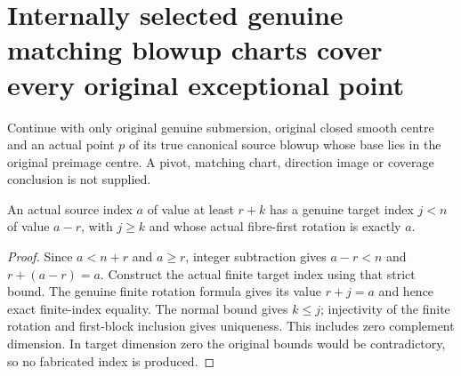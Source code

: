 \section{Internally selected genuine matching blowup charts cover every original exceptional point}
Continue with only original genuine submersion, original closed smooth centre and an actual point $p$ of its true canonical source blowup whose base lies in the original preimage centre. A pivot, matching chart, direction image or coverage conclusion is not supplied.

\begin{lemma}
\label{hir:submersion-adapted-blowup-cover-original-index}
\leanok
{}

An actual source index $a$ of value at least $r+k$ has a genuine target index $j<n$ of value $a-r$, with $j\geq k$ and whose actual fibre-first rotation is exactly $a$.
\end{lemma}
\begin{proof}
Since $a<n+r$ and $a\geq r$, integer subtraction gives $a-r<n$ and $r+(a-r)=a$. Construct the actual finite target index using that strict bound. The genuine finite rotation formula gives its value $r+j=a$ and hence exact finite-index equality. The normal bound gives $k\leq j$; injectivity of the finite rotation and first-block inclusion gives uniqueness. This includes zero complement dimension. In target dimension zero the original bounds would be contradictory, so no fabricated index is produced.
\end{proof}

